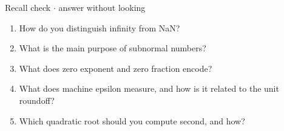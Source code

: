 \documentclass[11pt]{article}
\begin{document}
\begin{keepsection}
\begin{keepsection}
\begin{recallbox}{Recall check \ensuremath{\cdot} answer without looking}
\begin{enumerate}
\item How do you distinguish infinity from NaN?
\item What is the main purpose of subnormal numbers?
\item What does zero exponent and zero fraction encode?
\item What does machine epsilon measure, and how is it related to the unit roundoff?
\item Which quadratic root should you compute second, and how?
\end{enumerate}

\end{recallbox}
\end{keepsection}
\end{keepsection}
\end{document}

